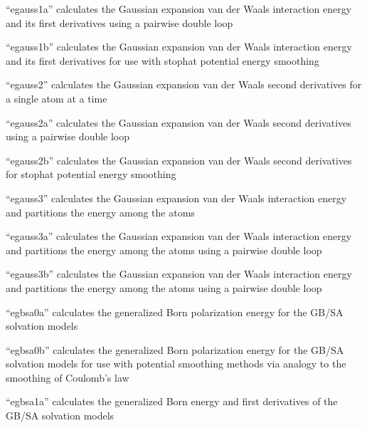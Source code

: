 \documentclass[letterpaper,11pt,english]{sphinxmanual}
\begin{document}
“egauss1a” calculates the Gaussian expansion van der Waals interaction energy and its first derivatives using a pairwise double loop


“egauss1b” calculates the Gaussian expansion van der Waals interaction energy and its first derivatives for use with stophat potential energy smoothing


“egauss2” calculates the Gaussian expansion van der Waals second derivatives for a single atom at a time


“egauss2a” calculates the Gaussian expansion van der Waals second derivatives using a pairwise double loop


“egauss2b” calculates the Gaussian expansion van der Waals second derivatives for stophat potential energy smoothing


“egauss3” calculates the Gaussian expansion van der Waals interaction energy and partitions the energy among the atoms


“egauss3a” calculates the Gaussian expansion van der Waals interaction energy and partitions the energy among the atoms using a pairwise double loop


“egauss3b” calculates the Gaussian expansion van der Waals interaction energy and partitions the energy among the atoms using a pairwise double loop


“egbsa0a” calculates the generalized Born polarization energy for the GB/SA solvation models


“egbsa0b” calculates the generalized Born polarization energy for the GB/SA solvation models for use with potential smoothing methods via analogy to the smoothing of Coulomb’s law


“egbsa1a” calculates the generalized Born energy and first derivatives of the GB/SA solvation models
\end{document}
